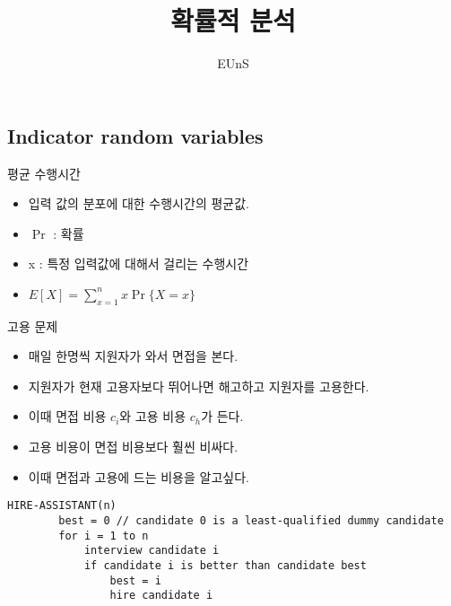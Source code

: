 \documentclass[10pt]{beamer}
\title{확률적 분석}
\author{EUnS}
\begin{document}
\begin{frame}{}
    \maketitle
\end{frame}    



\subsection{Indicator random variables} 

\begin{frame}{평균 수행시간}
    \pause
    \begin{itemize}
        \item 입력 값의 분포에 대한 수행시간의 평균값.\pause
        \item $\Pr$ : 확률\pause
        \item x : 특정 입력값에 대해서 걸리는 수행시간\pause
        \item $\displaystyle E[X] = \sum_{x=1}^n x\Pr\{X=x\}$
    \end{itemize}
\end{frame}

\begin{frame}{고용 문제}
    \begin{itemize}
        \item 매일 한명씩 지원자가 와서 면접을 본다. \pause
        \item 지원자가 현재 고용자보다 뛰어나면 해고하고 지원자를 고용한다.\pause
        \item 이때 면접 비용 $c_i$와 고용 비용 $c_h$가 든다.\pause
        \item 고용 비용이 면접 비용보다 훨씬 비싸다.\pause
        \item 이때 면접과 고용에 드는 비용을 알고싶다.
    \end{itemize}
\end{frame}


\begin{frame}[fragile]{}
    \begin{lstlisting}[style = CppStyle]
    HIRE-ASSISTANT(n)
        best = 0 // candidate 0 is a least-qualified dummy candidate
        for i = 1 to n
            interview candidate i
            if candidate i is better than candidate best
                best = i
                hire candidate i
    \end{lstlisting}
\end{frame}    
\end{document}
